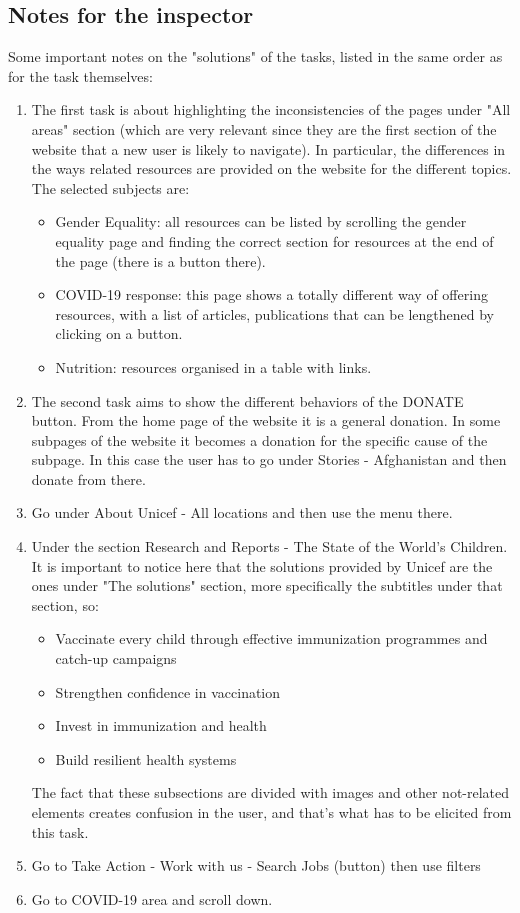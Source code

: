 \documentclass[11pt]{article}
\begin{document}
	\clearpage
	
	
	\subsection*{Notes for the inspector}
	Some important notes on the "solutions" of the tasks, listed in the same order as for the task themselves:
	\begin{enumerate}
		\item The first task is about highlighting the inconsistencies of the pages under "All areas" section (which are very relevant since they are the first section of the website that a new user is likely to navigate). 
		In particular, the differences in the ways related resources are provided on the website for the different topics. The selected subjects are:
		\begin{itemize}
			\item Gender Equality: all resources can be listed by scrolling the gender equality page and finding the correct section for resources at the end of the page (there is a button there).
			\item COVID-19 response: this page shows a totally different way of offering resources, with a list of articles, publications that can be lengthened by clicking on a button.
			\item Nutrition: resources organised in a table with links.
		\end{itemize}
		\item The second task aims to show the different behaviors of the DONATE button. From the home page of the website it is a general donation. In some subpages of the website it becomes a donation for the specific cause of the subpage. In this case the user has to go under Stories - Afghanistan and then donate from there.
		\item Go under About Unicef - All locations and then use the menu there.
		\item Under the section Research and Reports - The State of the World's Children. It is important to notice here that the solutions provided by Unicef are the ones under "The solutions" section, more specifically the subtitles under that section, so:
		\begin{itemize}
			\item Vaccinate every child through effective immunization programmes and catch-up campaigns
			\item Strengthen confidence in vaccination
			\item Invest in immunization and health  
			\item Build resilient health systems 
		\end{itemize}
		The fact that these subsections are divided with images and other not-related elements creates confusion in the user, and that's what has to be elicited from this task.
		\item Go to Take Action - Work with us - Search Jobs (button) then use filters
		\item Go to COVID-19 area and scroll down.
	\end{enumerate}
	
	
	
\end{document}
